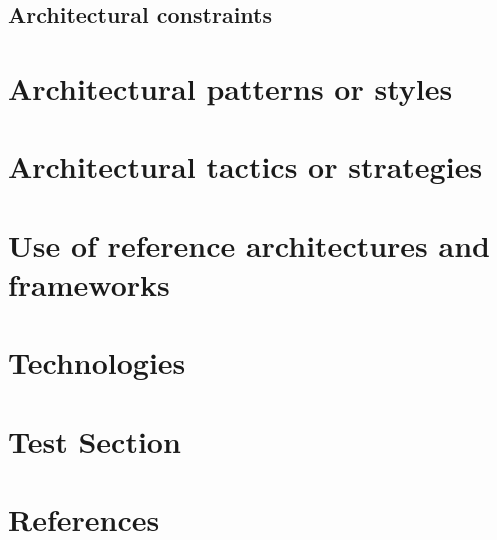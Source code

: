 \documentclass[11pt,a4paper,titlepage]{article}
\begin{document}
	\subsection{Architectural constraints}

	

\section{Architectural patterns or styles}

	

\section{Architectural tactics or strategies}

	

\section{Use of reference architectures and frameworks}

	
	

\section {Technologies}



\section{Test Section}



\section{References}


\end{document}
